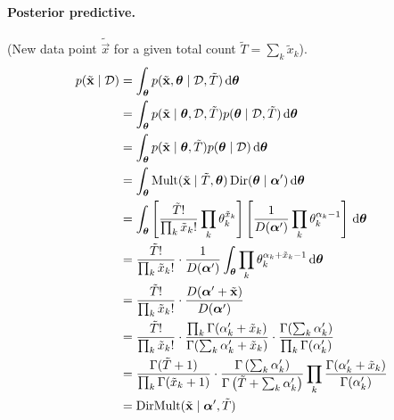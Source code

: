 \paragraph{Posterior predictive.} (New data point $\tilde{\vec x}$ for a given total count $\tilde T = \sum_k \tilde x_k$).
    \begin{align*}
        p(\tilde{\boldsymbol{\mathbf{x}}} \mid \mathcal D)   &= \int_{\boldsymbol{\mathbf{\theta}}} p(\tilde{\boldsymbol{\mathbf{x}}}, \boldsymbol{\mathbf{\theta}} \mid \mathcal D, \tilde T) \,\mathrm d\boldsymbol{\mathbf{\theta}} \\
                                            &= \int_{\boldsymbol{\mathbf{\theta}}} p(\tilde{\boldsymbol{\mathbf{x}}} \mid \boldsymbol{\mathbf{\theta}}, \mathcal D, \tilde T) p(\boldsymbol{\mathbf{\theta}} \mid \mathcal D, \tilde T) \,\mathrm d\boldsymbol{\mathbf{\theta}} \\
                                            &= \int_{\boldsymbol{\mathbf{\theta}}} p(\tilde{\boldsymbol{\mathbf{x}}} \mid \boldsymbol{\mathbf{\theta}}, \tilde T) p(\boldsymbol{\mathbf{\theta}} \mid \mathcal D) \,\mathrm d\boldsymbol{\mathbf{\theta}} \\
                                            &= \int_{\boldsymbol{\mathbf{\theta}}} \operatorname{Mult}(\tilde{\boldsymbol{\mathbf{x}}} \mid \tilde T, \boldsymbol{\mathbf{\theta}}) \operatorname{Dir}(\boldsymbol{\mathbf{\theta}} \mid \boldsymbol{\mathbf{\alpha}}') \,\mathrm d\boldsymbol{\mathbf{\theta}} \\
                                            &= \int_{\boldsymbol{\mathbf{\theta}}} \left[\frac{\tilde T!}{\prod_k \tilde x_k!} \prod_k \theta_k^{\tilde x_k}\right] \left[\frac{1}{D(\boldsymbol{\mathbf{\alpha}}')} \prod_k \theta_k^{\alpha_k - 1}\right] \,\mathrm d\boldsymbol{\mathbf{\theta}} \\
                                            &= \frac{\tilde T!}{\prod_k \tilde x_k!} \cdot \frac{1}{D(\boldsymbol{\mathbf{\alpha}}')} \int_{\boldsymbol{\mathbf{\theta}}} \prod_k \theta_k^{\alpha_k + \tilde x_k - 1} \,\mathrm d\boldsymbol{\mathbf{\theta}} \\
                                            &= \frac{\tilde T!}{\prod_k \tilde x_k!} \cdot \frac{D(\boldsymbol{\mathbf{\alpha}}' + \tilde{\boldsymbol{\mathbf{x}}})}{D(\boldsymbol{\mathbf{\alpha}}')} \\
                                            &= \frac{\tilde T!}{\prod_k \tilde x_k!} \cdot \frac{\prod_k \Gamma(\alpha'_k + \tilde x_k)}{\Gamma(\sum_k \alpha'_k + \tilde x_k)} \cdot \frac{\Gamma(\sum_k \alpha'_k)}{\prod_k \Gamma(\alpha'_k)} \\
                                            &= \frac{\Gamma(\tilde T + 1)}{\prod_k \Gamma(\tilde x_k + 1)} \cdot \frac{\Gamma\left(\sum_k \alpha'_k\right)}{\Gamma\left(\tilde T + \sum_k \alpha'_k\right)} \prod_k \frac{\Gamma(\alpha'_k + \tilde x_k)}{\Gamma(\alpha'_k)} \\
                                            &= \operatorname{DirMult}(\tilde{\boldsymbol{\mathbf{x}}} \mid \boldsymbol{\mathbf{\alpha}}', \tilde T)
    \end{align*}
